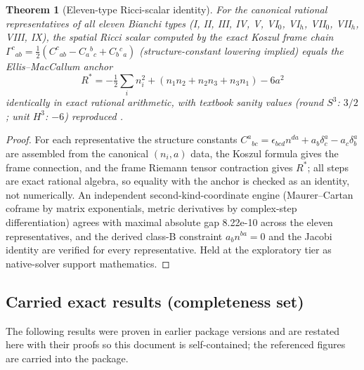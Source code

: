 \documentclass[10pt]{article}
\newtheorem{theorem}{Theorem}[section]
\theoremstyle{definition}
\begin{document}
\begin{theorem}[Eleven-type Ricci-scalar identity]
\label{thm:ricci}
For the canonical rational representatives of all eleven Bianchi
types (I, II, III, IV, V, VI$_0$, VI$_h$, VII$_0$, VII$_h$, VIII, IX),
the spatial Ricci scalar computed by the exact Koszul frame chain
$\Gamma^c{}_{ab} = \tfrac12(C^c{}_{ab} - C_a{}^{b}{}_{c} +
C_b{}^{c}{}_{a})$ (structure-constant lowering implied) equals the
Ellis--MacCallum anchor
\begin{equation}
R^\ast = -\tfrac12\textstyle\sum_i n_i^2 + (n_1 n_2 + n_2 n_3 +
n_3 n_1) - 6a^2
\end{equation}
identically in exact rational arithmetic, with textbook sanity values
(round $S^3$: $3/2$; unit $H^3$: $-6$) reproduced
\cite{EllisMacCallum1969}.
\end{theorem}
\begin{proof}
For each representative the structure constants
$C^a{}_{bc} = \epsilon_{bcd}n^{da} + a_b\delta^a_c - a_c\delta^a_b$
are assembled from the canonical $(n_i, a)$ data, the Koszul formula
gives the frame connection, and the frame Riemann tensor contraction
gives $R^\ast$; all steps are exact rational algebra, so equality with
the anchor is checked as an identity, not numerically. An independent
second-kind-coordinate engine (Maurer--Cartan coframe by matrix
exponentials, metric derivatives by complex-step differentiation)
agrees with maximal absolute gap 8.22e-10 across the eleven
representatives, and the derived class-B constraint $a_b n^{ba} = 0$
and the Jacobi identity are verified for every representative. Held
at the exploratory tier as native-solver support mathematics.
\end{proof}

\subsection{Carried exact results (completeness set)}

The following results were proven in earlier package versions and are
restated here with their proofs so this document is self-contained;
the referenced figures are carried into the package.
\end{document}
